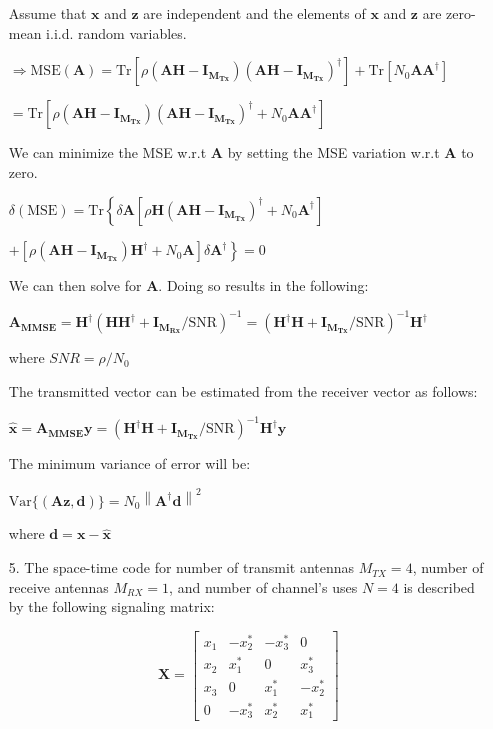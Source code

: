 \documentclass[fleqn]{article}
\makeatletter
\newcommand{\norm}[1]{\left \lVert #1 \right \rVert}
\newenvironment{equationCenter}{\@fleqnfalse\begin{equation*}}{\end{equation*}}
\makeatother
\begin{document}
\begin{enumerate}
		Assume that $\mathbf{x}$ and $\mathbf{z}$ are independent and the elements of $\mathbf{x}$ and $\mathbf{z}$ are zero-mean i.i.d. random variables.
		
		$\Rightarrow \text{MSE}(\mathbf{A}) = \text{Tr}[\rho(\mathbf{AH} - \mathbf{I_{M_{Tx}}})(\mathbf{AH} - \mathbf{I_{M_{Tx}}})^{\dagger}] + \text{Tr}[N_0\mathbf{AA^{\dagger}}]$
		
		$ = \text{Tr}[\rho(\mathbf{AH} - \mathbf{I_{M_{Tx}}})(\mathbf{AH} - \mathbf{I_{M_{Tx}}})^{\dagger} + N_0\mathbf{AA^{\dagger}}]$
		
		We can minimize the MSE w.r.t $\mathbf{A}$ by setting the MSE variation w.r.t $\mathbf{A}$ to zero.
		
		$\delta(\text{MSE}) = \text{Tr}\left\{\delta\mathbf{A}[\rho\mathbf{H}(\mathbf{AH} - \mathbf{I_{M_{Tx}}})^{\dagger} + N_0\mathbf{A}^{\dagger}]\right.$
		
		$ \left. + [\rho(\mathbf{AH} - \mathbf{I_{M_{Tx}}})\mathbf{H}^{\dagger} + N_0\mathbf{A}]\delta\mathbf{A}^{\dagger}\right\} = 0$
		
		We can then solve for $\mathbf{A}$. Doing so results in the following:
		
		$\mathbf{A_{MMSE}} = \mathbf{H^{\dagger}}(\mathbf{HH^{\dagger}} + \mathbf{I_{M_{Rx}}}/\text{SNR})^{-1} = (\mathbf{H^{\dagger}H} + \mathbf{I_{M_{Tx}}}/\text{SNR})^{-1}\mathbf{H^{\dagger}}$
		
		where $SNR = \rho/N_0$
		
		The transmitted vector can be estimated from the receiver vector as follows:
		
		$\mathbf{\hat{x}} = \mathbf{A_{MMSE}y} =(\mathbf{H^{\dagger}H} + \mathbf{I_{M_{Tx}}}/\text{SNR})^{-1}\mathbf{H^{\dagger}y}$
		
		The minimum variance of error will be:
		
		$\text{Var}\{(\mathbf{Az},\mathbf{d})\} = N_0\norm{\mathbf{A^{\dagger}d}}^2$
		
		where $\mathbf{d} = \mathbf{x} - \mathbf{\hat{x}}$
		
		\item[5.] The space-time code for number of transmit antennas $M_{TX}=4$, number of receive antennas $M_{RX}=1$, and number of channel's uses $N=4$ is described by the following signaling matrix:
		
		\begin{equationCenter}
			\mathbf{X} = \begin{bmatrix}
				x_1 & -x_2^* & -x_3^* &  0 \\ 
				x_2 &  x_1^* &  0     &  x_3^* \\
				x_3 &  0     &  x_1^* & -x_2^* \\
				0   & -x_3^* &  x_2^* &  x_1^*
			\end{bmatrix}
		\end{equationCenter}
		

\end{enumerate}
\end{document}

